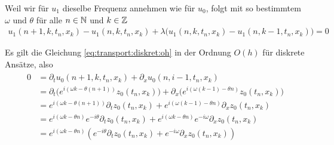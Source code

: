 Weil wir für $u_1$ dieselbe Frequenz annehmen wie für $u_0$, folgt mit so bestimmtem $\omega$ und $\theta$ für alle $n \in \mathbb N$ und $k \in \mathbb Z$
\begin{align}\label{eq:wkb:bed1}
u_1(n+1,k,t_n,x_k) - u_1(n,k,t_n,x_k) + \lambda \bigl(u_1(n,k,t_n,x_k) - u_1(n,k-1,t_n,x_k) \bigr) = 0
\end{align}

Es gilt die Gleichung \eqref{eq:transport:diskret:oh} in der Ordnung $O(h)$ für diskrete Ansätze, also
\begin{align}\begin{split}
0 &= \partial_t u_0(n+1, k, t_n, x_k) + \partial_x u_0(n, i-1, t_n, x_k)\\
&= \partial_t  \bigl( e^{i (\omega k - \theta (n+1))} z_0(t_n, x_k) \bigr) + \partial_x \bigl(  e^{i (\omega (k-1) - \theta n)} z_0(t_n, x_k)\bigr)\\
&= e^{i (\omega k - \theta (n+1))} \partial_t z_0(t_n, x_k) + e^{i (\omega (k-1) - \theta n)} \partial_x z_0(t_n, x_k)\\
&= e^{i (\omega k - \theta n)} e^{- i \theta} \partial_t z_0(t_n, x_k) + e^{i (\omega k - \theta n)} e^{-i \omega} \partial_x z_0(t_n, x_k)\\
&= e^{i (\omega k - \theta n)}  \left( e^{- i \theta} \partial_t z_0(t_n, x_k) + e^{-i \omega} \partial_x z_0(t_n, x_k) \right)\\
\end{split}\end{align}

